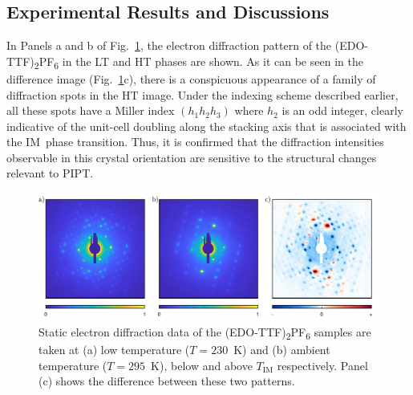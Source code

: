 \subsection{Experimental Results and Discussions}
\label{sec: UED-EDO-Results}

In Panels a and b of Fig.~\ref{fig: EDO-LTHT}, the electron diffraction pattern of
the (EDO-TTF)\textsubscript{2}PF\textsubscript{6} in the LT and HT phases are shown.
As it can be seen in the difference image (Fig.~\ref{fig: EDO-LTHT}c),
there is a conspicuous appearance of a family of diffraction spots in the HT image.
Under the indexing scheme described earlier, all these spots have a Miller index $(h_1 h_2 h_3)$
where $h_2$ is an odd integer, clearly indicative of the unit-cell doubling along the stacking axis
that is associated with the IM~phase transition.
%
Thus, it is confirmed that the diffraction intensities observable in this crystal orientation
are sensitive to the structural changes relevant to PIPT.
%
\begin{figure}[ht!]
  \centering
  \includegraphics[width = \textwidth]{Figures/fig_EDO_LTHT.pdf}
  \caption[Static electron diffraction patterns of (EDO-TTF)\textsubscript{2}PF\textsubscript{6}
  above and below $T_\text{IM}$.]{
    Static electron diffraction data of the (EDO-TTF)\textsubscript{2}PF\textsubscript{6} samples
    are taken at (a) low temperature ($T = 230$~K) and (b) ambient temperature ($T = 295$~K),
    below and above $T_\text{IM}$ respectively.
    Panel (c) shows the difference between these two patterns.
  }
  \label{fig: EDO-LTHT}
\end{figure}

